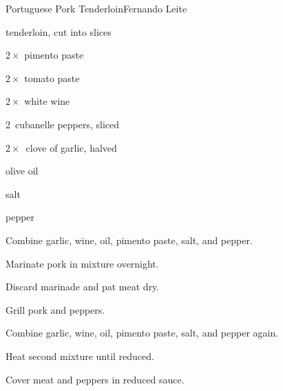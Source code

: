 \begin{recipe}{Portuguese Pork Tenderloin\FIXME}{Fernando Leite}{}

\begin{ingredients}
\item {} tenderloin, cut into slices
\item $2\times$ pimento paste
\item $2\times$ tomato paste
\item $2\times$\C{\third} white wine
\item 2~cubanelle peppers, sliced
\item $2\times$~clove of garlic, halved
\item olive oil
\item salt
\item pepper
\end{ingredients}

\begin{directions}
\item Combine garlic, wine, oil, pimento paste, salt, and pepper.
\item Marinate pork in mixture overnight.
\item Discard marinade and pat meat dry.
\item Grill pork and peppers.
\item Combine garlic, wine, oil, pimento paste, salt, and pepper again.
\item Heat second mixture until reduced.
\item Cover meat and peppers in reduced sauce.
\end{directions}

\end{recipe}
